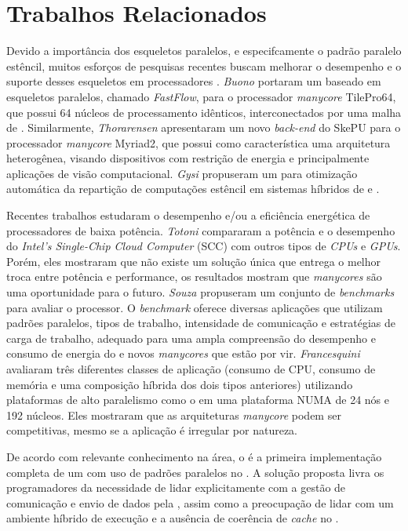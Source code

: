 %
\chapter{Trabalhos Relacionados}

Devido a importância dos esqueletos paralelos, e especifcamente o padrão paralelo estêncil, muitos esforços de pesquisas recentes buscam melhorar o desempenho e o suporte desses esqueletos em processadores \manycore. \textit{Buono} \etal\citeyear{buono13} portaram um \fw baseado em esqueletos paralelos, chamado \textit{FastFlow}, para o processador \textit{manycore} TilePro64, que possui 64 núcleos de processamento idênticos, interconectados por uma malha de \noc. Similarmente, \textit{Thorarensen} \etal\citeyear{thoraransen16} apresentaram um novo \textit{back-end} do \fw SkePU para o processador \textit{manycore} Myriad2, que possui como característica uma arquitetura heterogênea, visando dispositivos com restrição de energia e principalmente aplicações de visão computacional. \textit{Gysi} \etal\citeyear{gysi15} propuseram um \fw para otimização automática da repartição de computações estêncil em sistemas híbridos de \cpu e \gpu.

Recentes trabalhos estudaram o desempenho e/ou a eficiência energética de processadores \manycore de baixa potência. \textit{Totoni} \etal\citeyear{SCCEnergy:2012} compararam a potência e o desempenho do \textit{Intel's Single-Chip Cloud Computer} (SCC) com outros tipos de \textit{CPUs} e \textit{GPUs}. Porém, eles mostraram que não existe um solução única que entrega o melhor troca entre potência e performance, os resultados mostram que \textit{manycores} são uma oportunidade para o futuro. \textit{Souza} \etal\citeyear{Castro-Souza-CCPE:2016} propuseram um conjunto de \textit{benchmarks} para avaliar o \mppa \manycore processor. O \textit{benchmark} oferece diversas aplicações que utilizam padrões paralelos, tipos de trabalho, intensidade de comunicação e estratégias de carga de trabalho, adequado para uma ampla compreensão do desempenho e consumo de energia do \mppa e novos \textit{manycores} que estão por vir. \textit{Francesquini} \etal\citeyear{francesquini:hal-01092325} avaliaram três diferentes classes de aplicação (consumo de CPU, consumo de memória e uma composição híbrida dos dois tipos anteriores) utilizando plataformas de alto paralelismo como o \mppa em uma plataforma NUMA de 24 nós e 192 núcleos. Eles mostraram que as arquiteturas \textit{manycore} podem ser competitivas, mesmo se a aplicação é irregular por natureza.

De acordo com relevante conhecimento na área, o \pskelmppa é a primeira implementação completa de um \fw com uso de padrões paralelos no \mppa. A solução proposta \cite{Podesta:TCC} livra os programadores da necessidade de lidar explicitamente com a gestão de comunicação e envio de dados pela \noc, assim como a preocupação de lidar com um ambiente híbrido de execução e a ausência de coerência de \textit{cache} no \mppa.